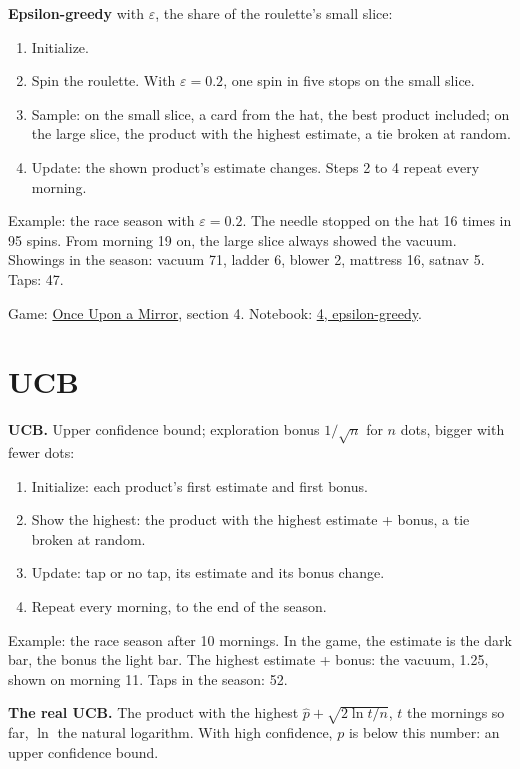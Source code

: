 \documentclass[11pt,a4paper]{article}
\newcommand{\term}[1]{\textbf{#1}}
\newcommand{\beside}[2]{\par\noindent\sbox{\besidebox}{#1}\usebox{\besidebox}\hfill
  \begin{minipage}[c]{\dimexpr\textwidth-\wd\besidebox-1.5em\relax}\raggedright#2\end{minipage}\par}
\newcommand{\Mirror}{\href{https://eth-ainit-hs26.github.io/AINIT-PAGE/viz/we2/mirror/}{Once Upon a Mirror}}
\newcommand{\NbFour}{\href{https://colab.research.google.com/github/eth-ainit-hs26/w2-cx-public/blob/main/03_cx_bandits_4_epsilon_greedy_student.ipynb}{4, epsilon-greedy}}
\begin{document}
\term{Epsilon-greedy} with $\varepsilon$, the share of the roulette's small slice:
\begin{enumerate}
\item Initialize.
\item Spin the roulette. With $\varepsilon = 0.2$, one spin in five stops on the small slice.
\item Sample: on the small slice, a card from the hat, the best product included; on the large slice, the product
  with the highest estimate, a tie broken at random.
\item Update: the shown product's estimate changes. Steps 2 to 4 repeat every morning.
\end{enumerate}

Example: the race season with $\varepsilon = 0.2$. The needle stopped on the hat 16 times in 95 spins. From morning
19 on, the large slice always showed the vacuum. Showings in the season: vacuum 71, ladder 6, blower 2, mattress 16,
satnav 5. Taps: 47.

Game: \Mirror, section 4. Notebook: \NbFour.

\section{UCB}

\term{UCB.} Upper confidence bound; exploration bonus $1/\sqrt{n}$ for $n$ dots, bigger with fewer dots:
\begin{enumerate}
\item Initialize: each product's first estimate and first bonus.
\item Show the highest: the product with the highest estimate + bonus, a tie broken at random.
\item Update: tap or no tap, its estimate and its bonus change.
\item Repeat every morning, to the end of the season.
\end{enumerate}

\beside{}{Example: the race season after 10 mornings. In the game, the estimate is
the dark bar, the bonus the light bar. The highest estimate + bonus: the vacuum, 1.25, shown on morning 11. Taps in
the season: 52.}

\term{The real UCB.} The product with the highest $\hat p + \sqrt{2 \ln t / n}$, $t$ the mornings so
far, $\ln$ the natural logarithm. With high confidence, $p$ is below this number: an upper confidence bound.
\end{document}
